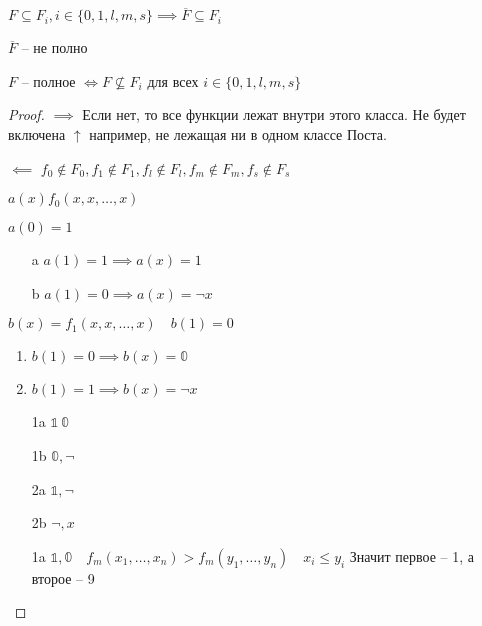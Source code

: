 \documentclass{book}
\theoremstyle{definition}
\begin{document}
    \begin{lemma}
        $F\subseteq F_i, i\in\{0,1,l,m,s\} \implies \overline{F}\subseteq F_i$
    \end{lemma}
    \begin{corollary}
        $\overline{F}$ -- не полно
    \end{corollary}
    \begin{theorem}
         $F$ -- полное $\iff F \not\subseteq F_i$ для всех $i\in \{0,1,l,m,s\}$
    \end{theorem}
    \begin{proof}
        $\implies $ Если нет, то все функции лежат внутри этого класса. Не будет включена $\uparrow$ например, не лежащая ни в одном классе Поста.

        $\impliedby $ $f_0\not\in F_0, f_1 \not\in F_1, f_l \not\in F_l, f_m \not\in F_m, f_s \not\in F_s$

        $a(x) f_0\left(x, x, \ldots, x  \right) $

        $a\left(  0 \right) = 1$

        \begin{itemize}
            \item[a] $a(1) = 1 \implies a(x) = 1$
            \item[b] $a(1) = 0 \implies a(x) = \neg x$
        \end{itemize}
        $b(x) = f_1(x, x, \ldots, x)\quad b(1) = 0$
        \begin{enumerate}
            \item $b(1) = 0 \implies b(x) = \mathbb{0}$
            \item $b(1) = 1 \implies  b(x) = \neg x$
        \end{enumerate}

        \begin{itemize}
            \item [1a] $\mathbb{1~0}$
            \item [1b] $\mathbb{0}, \neg$
            \item [2a]  $\mathbb{1}, \neg$ 
            \item [2b] $\neg, x$
        \end{itemize}

        \begin{itemize}
            \item [1a] $\mathbb{1,0}\quad f_m(x_1, \ldots, x_{n} ) >f_m(y_1, \ldots, y_{n} )\quad x_i\leqslant y_i$ Значит первое -- 1, а второе -- 9


\end{itemize}
\end{proof}
\end{document}
